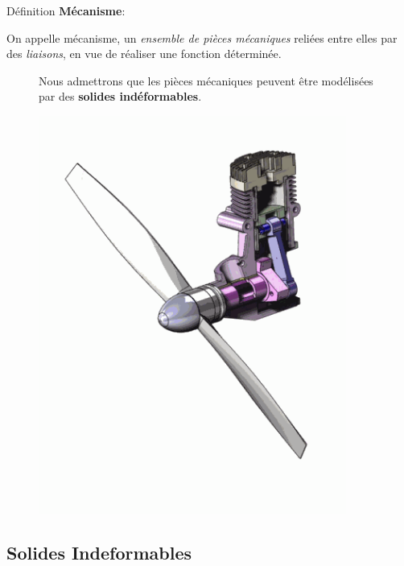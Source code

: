 \documentclass[
  ignorenonframetext,
  aspectratio=169,
  c]{beamer}
\begin{document}
\begin{frame}{Définition}
\textbf{Mécanisme}:

On appelle mécanisme, un \emph{ensemble de pièces mécaniques} reliées
entre elles par des \emph{liaisons}, en vue de réaliser une fonction
déterminée.

\begin{figure}

\begin{minipage}{0.70\linewidth}
Nous admettrons que les pièces mécaniques peuvent être modélisées par
des \textbf{solides indéformables}.\end{minipage}%
%
\begin{minipage}{0.30\linewidth}

\includegraphics[width=0.9\textwidth,height=\textheight]{CM3/turbina.gif}

\end{minipage}%

\end{figure}%
\end{frame}

\subsection{Solides Indeformables}\label{solides-indeformables}
\end{document}
